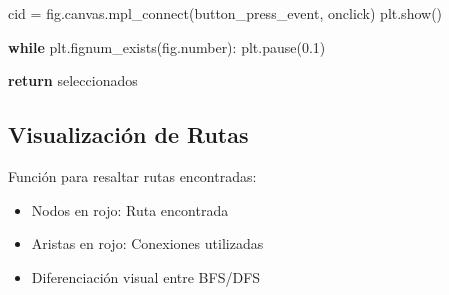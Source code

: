 \documentclass[
  spanish,
  letterpaper,
  DIV=11,
  numbers=noendperiod]{scrartcl}
\newenvironment{Shaded}{\begin{snugshade}}{\end{snugshade}}
\newcommand{\ControlFlowTok}[1]{\textcolor[rgb]{0.00,0.23,0.31}{\textbf{#1}}}
\newcommand{\FloatTok}[1]{\textcolor[rgb]{0.68,0.00,0.00}{#1}}
\newcommand{\NormalTok}[1]{\textcolor[rgb]{0.00,0.23,0.31}{#1}}
\newcommand{\OperatorTok}[1]{\textcolor[rgb]{0.37,0.37,0.37}{#1}}
\newcommand{\StringTok}[1]{\textcolor[rgb]{0.13,0.47,0.30}{#1}}
\begin{document}
\begin{Shaded}
\begin{Highlighting}[]
\NormalTok{    cid }\OperatorTok{=}\NormalTok{ fig.canvas.mpl\_connect(}\StringTok{\textquotesingle{}button\_press\_event\textquotesingle{}}\NormalTok{, onclick)}
\NormalTok{    plt.show()}

    \ControlFlowTok{while}\NormalTok{ plt.fignum\_exists(fig.number):}
\NormalTok{        plt.pause(}\FloatTok{0.1}\NormalTok{)}

    \ControlFlowTok{return}\NormalTok{ seleccionados}
\end{Highlighting}
\end{Shaded}

\subsection{Visualización de Rutas}\label{visualizaciuxf3n-de-rutas}

Función para resaltar rutas encontradas:

\begin{itemize}
\item
  Nodos en rojo: Ruta encontrada
\item
  Aristas en rojo: Conexiones utilizadas
\item
  Diferenciación visual entre BFS/DFS
\end{itemize}
\end{document}
